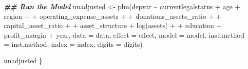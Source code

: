 \documentclass[a4paper,nobind]{templates/ociamthesis}
\newenvironment{Shaded}{\begin{snugshade}}{\end{snugshade}}
\newcommand{\AttributeTok}[1]{\textcolor[rgb]{0.77,0.63,0.00}{#1}}
\newcommand{\DocumentationTok}[1]{\textcolor[rgb]{0.56,0.35,0.01}{\textbf{\textit{#1}}}}
\newcommand{\FunctionTok}[1]{\textcolor[rgb]{0.00,0.00,0.00}{#1}}
\newcommand{\NormalTok}[1]{#1}
\newcommand{\OtherTok}[1]{\textcolor[rgb]{0.56,0.35,0.01}{#1}}
\newcommand{\SpecialCharTok}[1]{\textcolor[rgb]{0.00,0.00,0.00}{#1}}
\renewenvironment{Shaded}
{
  \vspace{10pt}%
  \begin{snugshade}%
}{%
  \end{snugshade}%
  \vspace{8pt}%
}
\begin{document}
\begin{Shaded}
\begin{Highlighting}[]
  \DocumentationTok{\#\# Run the Model}
\NormalTok{  unadjusted }\OtherTok{\textless{}{-}} \FunctionTok{plm}\NormalTok{(depvar }\SpecialCharTok{\textasciitilde{}}\NormalTok{ currentlegalstatus }\SpecialCharTok{+}\NormalTok{ age }\SpecialCharTok{+}\NormalTok{ region }\SpecialCharTok{+}
\SpecialCharTok{+}\NormalTok{           operating\_expense\_assets }\SpecialCharTok{+} 
\SpecialCharTok{+}\NormalTok{           donations\_assets\_ratio }\SpecialCharTok{+} 
\SpecialCharTok{+}\NormalTok{           capital\_asset\_ratio }\SpecialCharTok{+}
\SpecialCharTok{+}\NormalTok{           asset\_structure }\SpecialCharTok{+} \FunctionTok{log}\NormalTok{(assets) }\SpecialCharTok{+} 
\SpecialCharTok{+}\NormalTok{           education }\SpecialCharTok{+}\NormalTok{ profit\_margin }\SpecialCharTok{+}\NormalTok{ year, }
          \AttributeTok{data =}\NormalTok{ data, }\AttributeTok{effect =}\NormalTok{ effect,}
          \AttributeTok{model =}\NormalTok{ model, }
          \AttributeTok{inst.method =}\NormalTok{ inst.method, }\AttributeTok{index =}\NormalTok{ index, }
          \AttributeTok{digits =}\NormalTok{ digits)}

\NormalTok{unadjusted}
\NormalTok{\}}
\end{Highlighting}
\end{Shaded}
\end{document}

